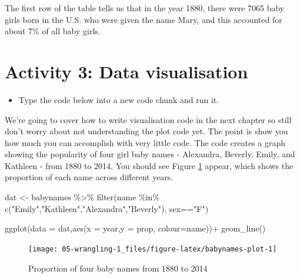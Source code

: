 \documentclass[
  oneside]{book}
\newenvironment{Shaded}{\begin{snugshade}}{\end{snugshade}}
\newcommand{\AttributeTok}[1]{\textcolor[rgb]{0.77,0.63,0.00}{#1}}
\newcommand{\FunctionTok}[1]{\textcolor[rgb]{0.00,0.00,0.00}{#1}}
\newcommand{\NormalTok}[1]{#1}
\newcommand{\OtherTok}[1]{\textcolor[rgb]{0.56,0.35,0.01}{#1}}
\newcommand{\SpecialCharTok}[1]{\textcolor[rgb]{0.00,0.00,0.00}{#1}}
\newcommand{\StringTok}[1]{\textcolor[rgb]{0.31,0.60,0.02}{#1}}
\providecommand{\tightlist}{%
  \setlength{\itemsep}{0pt}\setlength{\parskip}{0pt}}
\begin{document}
The first row of the table tells us that in the year 1880, there were 7065 baby girls born in the U.S. who were given the name Mary, and this accounted for about 7\% of all baby girls.

\hypertarget{activity-3-data-visualisation}{%
\section{Activity 3: Data visualisation}\label{activity-3-data-visualisation}}

\begin{itemize}
\tightlist
\item
  Type the code below into a new code chunk and run it.
\end{itemize}

We're going to cover how to write visualisation code in the next chapter so still don't worry about not understanding the plot code yet. The point is show you how much you can accomplish with very little code. The code creates a graph showing the popularity of four girl baby names - Alexandra, Beverly, Emily, and Kathleen - from 1880 to 2014. You should see Figure \ref{fig:babynames-plot} appear, which shows the proportion of each name across different years.

\begin{Shaded}
\begin{Highlighting}[]
\NormalTok{dat }\OtherTok{\textless{}{-}}\NormalTok{ babynames }\SpecialCharTok{\%\textgreater{}\%} 
  \FunctionTok{filter}\NormalTok{(name }\SpecialCharTok{\%in\%} \FunctionTok{c}\NormalTok{(}\StringTok{"Emily"}\NormalTok{,}\StringTok{"Kathleen"}\NormalTok{,}\StringTok{"Alexandra"}\NormalTok{,}\StringTok{"Beverly"}\NormalTok{), sex}\SpecialCharTok{==}\StringTok{"F"}\NormalTok{)}

\FunctionTok{ggplot}\NormalTok{(}\AttributeTok{data =}\NormalTok{ dat,}\FunctionTok{aes}\NormalTok{(}\AttributeTok{x =}\NormalTok{ year,}\AttributeTok{y =}\NormalTok{ prop, }\AttributeTok{colour=}\NormalTok{name))}\SpecialCharTok{+}
  \FunctionTok{geom\_line}\NormalTok{()  }
\end{Highlighting}
\end{Shaded}

\begin{figure}

{\centering \texttt{[image: 05-wrangling-1\_files/figure-latex/babynames-plot-1]} 

}

\caption{Proportion of four baby names from 1880 to 2014}\label{fig:babynames-plot}
\end{figure}
\end{document}
